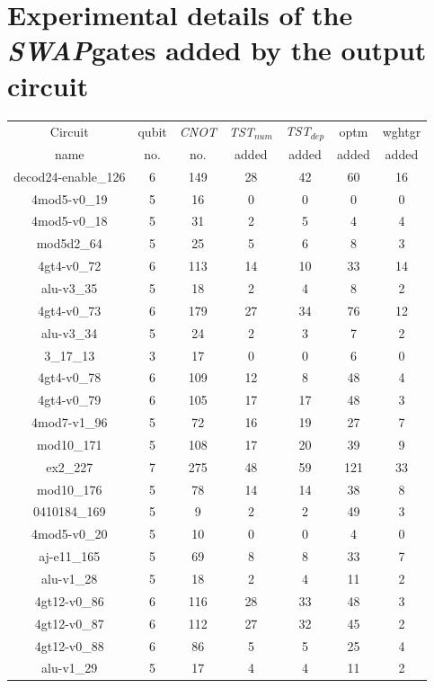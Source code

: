 \documentclass[runningheads]{llncs}
\begin{document}
\section{Experimental details of the \textit{SWAP}gates added by the output circuit}
\begin{table}[H]
	\begin{center}  
	\begin{tabular}{|c|c|c|c|c|c|c|}
	\hline
	Circuit &  qubit  & \textit{CNOT} &\textit{TST$_{num}$}& \textit{TST$_{dep}$}  & optm 	 & wghtgr 	\\
	 name	&   no. 	&	no. & added&  added &  added 	&  added\\
	\hline
	decod24-enable\_126 & 6 & 149 & 28 & 42 & 60 & 16 \\ 
4mod5-v0\_19 & 5 & 16 & 0 & 0 & 0 & 0 \\ 
4mod5-v0\_18 & 5 & 31 & 2 & 5 & 4 & 4 \\ 
mod5d2\_64 & 5 & 25 & 5 & 6 & 8 & 3 \\ 
4gt4-v0\_72 & 6 & 113 & 14 & 10 & 33 & 14 \\ 
alu-v3\_35 & 5 & 18 & 2 & 4 & 8 & 2 \\ 
4gt4-v0\_73 & 6 & 179 & 27 & 34 & 76 & 12 \\ 
alu-v3\_34 & 5 & 24 & 2 & 3 & 7 & 2 \\ 
3\_17\_13 & 3 & 17 & 0 & 0 & 6 & 0 \\ 
4gt4-v0\_78 & 6 & 109 & 12 & 8 & 48 & 4 \\ 
4gt4-v0\_79 & 6 & 105 & 17 & 17 & 48 & 3 \\ 
4mod7-v1\_96 & 5 & 72 & 16 & 19 & 27 & 7 \\ 
mod10\_171 & 5 & 108 & 17 & 20 & 39 & 9 \\ 
ex2\_227 & 7 & 275 & 48 & 59 & 121 & 33 \\ 
mod10\_176 & 5 & 78 & 14 & 14 & 38 & 8 \\ 
0410184\_169 & 5 & 9 & 2 & 2 & 49 & 3 \\ 
4mod5-v0\_20 & 5 & 10 & 0 & 0 & 4 & 0 \\ 
aj-e11\_165 & 5 & 69 & 8 & 8 & 33 & 7 \\ 
alu-v1\_28 & 5 & 18 & 2 & 4 & 11 & 2 \\ 
4gt12-v0\_86 & 6 & 116 & 28 & 33 & 48 & 3 \\ 
4gt12-v0\_87 & 6 & 112 & 27 & 32 & 45 & 2 \\ 
4gt12-v0\_88 & 6 & 86 & 5 & 5 & 25 & 4 \\ 
alu-v1\_29 & 5 & 17 & 4 & 4 & 11 & 2 \\ 

\end{tabular}
\end{center}
\end{table}
\end{document}
